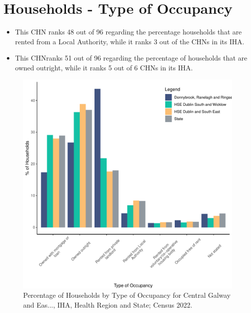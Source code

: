 \documentclass{article}
\begin{document}
\section{Households - Type of Occupancy}\label{sect:Households}
\begin{itemize}
\item This CHN ranks  48 out of 96 regarding the percentage households that are rented from a Local Authority, while it ranks  3 out of the CHNs in its IHA. 
\item This CHNranks  51 out of 96 regarding the percentage of households that are owned outright, while it ranks   5 out of 6 CHNs in its IHA.
\end{itemize}
\begin{figure}[H]
	\centering
	\includegraphics[width = 140mm]{../figures/HouseholdsED.pdf}
	\caption{Percentage of Households by Type of Occupancy for Central Galway and Eas..., IHA, Health Region and State; Census 2022.}
	\label{fig:vbnv}
	\end{figure}
\end{document}
